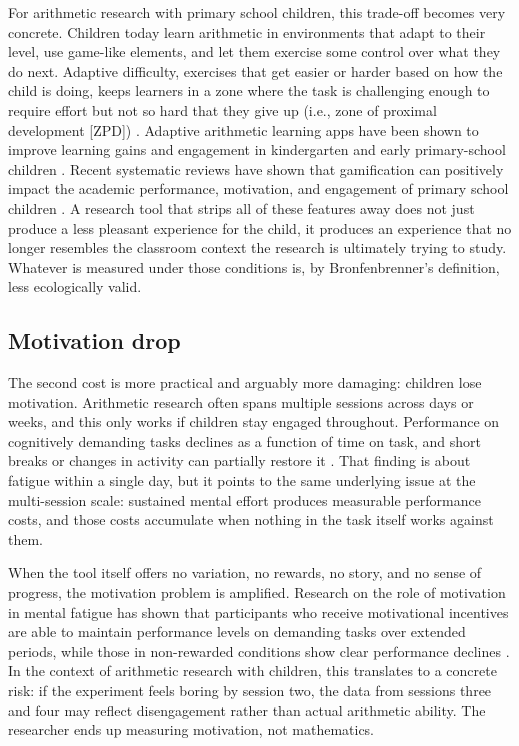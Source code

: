 For arithmetic research with primary school children, this trade-off becomes very concrete. Children today learn arithmetic in environments that adapt to their level, use game-like elements, and let them exercise some control over what they do next. Adaptive difficulty, exercises that get easier or harder based on how the child is doing, keeps learners in a zone where the task is challenging enough to require effort but not so hard that they give up (i.e., zone of proximal development [ZPD]) \cite{murray_zpd_2006}. Adaptive arithmetic learning apps have been shown to improve learning gains and engagement in kindergarten and early primary-school children \cite{bang2023mymathacademy}. Recent systematic reviews have shown that gamification can positively impact the academic performance, motivation, and engagement of primary school children \cite{manzanoleon2021gamification}. A research tool that strips all of these features away does not just produce a less pleasant experience for the child, it produces an experience that no longer resembles the classroom context the research is ultimately trying to study. Whatever is measured under those conditions is, by Bronfenbrenner's definition, less ecologically valid.

\subsection{Motivation drop}
The second cost is more practical and arguably more damaging: children lose motivation. Arithmetic research often spans multiple sessions across days or weeks, and this only works if children stay engaged throughout. Performance on cognitively demanding tasks declines as a function of time on task, and short breaks or changes in activity can partially restore it \cite{sievertsen2016cognitive}. That finding is about fatigue within a single day, but it points to the same underlying issue at the multi-session scale: sustained mental effort produces measurable performance costs, and those costs accumulate when nothing in the task itself works against them.

When the tool itself offers no variation, no rewards, no story, and no sense of progress, the motivation problem is amplified. Research on the role of motivation in mental fatigue has shown that participants who receive motivational incentives are able to maintain performance levels on demanding tasks over extended periods, while those in non-rewarded conditions show clear performance declines \cite{hopstaken2015role}. In the context of arithmetic research with children, this translates to a concrete risk: if the experiment feels boring by session two, the data from sessions three and four may reflect disengagement rather than actual arithmetic ability. The researcher ends up measuring motivation, not mathematics.

